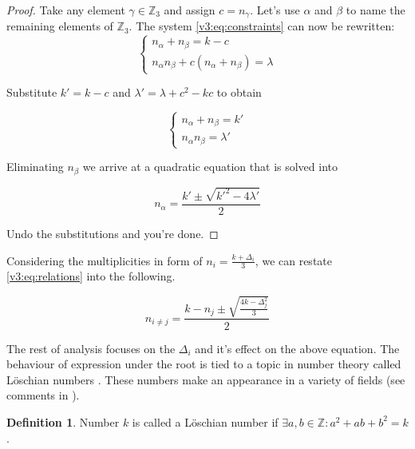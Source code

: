 \documentclass{article}
\theoremstyle{plain}
\theoremstyle{definition}
\newtheorem{definition}[theorem]{Definition}
\theoremstyle{remark}
\begin{document}
		\begin{proof}
			Take any element $\gamma \in \mathbb Z_3$ and assign $c = n_\gamma$. Let's use $\alpha$ and $\beta$ to name the remaining elements of $\mathbb Z_3$. The system \eqref{v3:eq:constraints} can now be rewritten:
			\begin{equation}
				\begin{cases}
					n_\alpha + n_\beta = k - c \\
					n_\alpha n_\beta + c (n_\alpha + n_\beta)  = \lambda 
				\end{cases}
			\end{equation}
			
			Substitute $k'=k-c$ and $\lambda' = \lambda + c^2-kc$ to obtain
			
			\begin{equation}
				\begin{cases}
					n_\alpha + n_\beta = k' \\
					n_\alpha n_\beta = \lambda'
				\end{cases}
			\end{equation}
			
			Eliminating $n_\beta$ we arrive at a quadratic equation that is solved into
			
			\begin{equation}
				n_\alpha = \frac{k' \pm \sqrt{k'^2-4\lambda'}}{2}
			\end{equation}
			
			Undo the substitutions and you're done.
		\end{proof}
		
		Considering the multiplicities in form of $n_i = \frac{k+\Delta_i}{3}$, we can restate \eqref{v3:eq:relations} into the following.
	
		\begin{equation}
			\label{v3:eq:relations_delta}
			n_{i\neq j} = \frac{k-n_j \pm \sqrt{\frac{4k-\Delta_j^2}{3}}}{2}
		\end{equation}
		
		The rest of analysis focuses on the $\Delta_i$ and it's effect on the above equation. The behaviour of expression under the root is tied to a topic in number theory called Löschian numbers \cite{oeisA003136}. These numbers make an appearance in a variety of fields (see comments in \cite{oeisA003136}).
		
		\begin{definition}
			\label{v3:def:loeshian}
			Number $k$ is called a Löschian number if $\exists a,b \in \mathbb Z \colon a^2+ab+b^2=k$.
		\end{definition}
		
\end{document}
